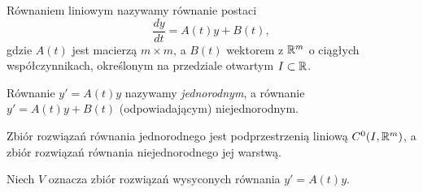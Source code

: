 %
\begin{definition}
  Równaniem liniowym nazywamy równanie postaci
  \begin{equation*}
    \frac{dy}{dt} = A(t)y + B(t),
  \end{equation*}
  gdzie $A(t)$ jest macierzą $m \times m$, a $B(t)$ wektorem z $\mathbb{R}^m$ o ciągłych współczynnikach, określonym na 
  przedziale otwartym $I \subset \mathbb{R}$.
\end{definition}
%
\begin{definition}
  Równanie $y' = A(t)y$ nazywamy \emph{jednorodnym}, a równanie $y' = A(t)y + B(t)$ (odpowiadającym) niejednorodnym.
\end{definition}

\begin{theorem}
  Zbiór rozwiązań równania jednorodnego jest podprzestrzenią liniową $C^0(I,\mathbb{R}^m)$, a zbiór rozwiązań równania 
  niejednorodnego jej warstwą.
\end{theorem}

\noindent Niech $V$ oznacza zbiór rozwiązań wysyconych równania $y' = A(t)y$.

